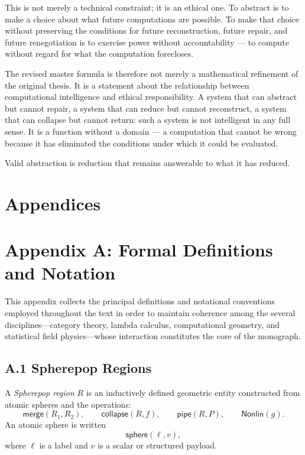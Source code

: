 \documentclass[12pt,letterpaper]{article}
\theoremstyle{remark}
\begin{document}
This is not merely a technical constraint; it is an ethical one.
To abstract is to make a choice about what future computations are
possible. To make that choice without preserving the conditions for
future reconstruction, future repair, and future renegotiation is
to exercise power without accountability — to compute without
regard for what the computation forecloses.

The revised master formula is therefore not merely a mathematical
refinement of the original thesis. It is a statement about the
relationship between computational intelligence and ethical
responsibility. A system that can abstract but cannot repair, a
system that can reduce but cannot reconstruct, a system that can
collapse but cannot return: such a system is not intelligent in any
full sense. It is a function without a domain — a computation that
cannot be wrong because it has eliminated the conditions under
which it could be evaluated.

Valid abstraction is reduction that remains answerable to what it
has reduced.

\newpage
\appendix
\section*{Appendices}


\section{Appendix A: Formal Definitions and Notation}

This appendix collects the principal definitions and notational conventions
employed throughout the text in order to maintain coherence among the several
disciplines---category theory, lambda calculus, computational geometry, and
statistical field physics---whose interaction constitutes the core of the
monograph.

\subsection*{A.1 Spherepop Regions}
A \emph{Spherepop region} $R$ is an inductively defined geometric entity constructed
from atomic spheres and the operations:
\[
\mathsf{merge}(R_1,R_2), 
\qquad
\mathsf{collapse}(R,f),
\qquad
\mathsf{pipe}(R,P),
\qquad
\mathsf{Nonlin}(g).
\]
An atomic sphere is written
\[
\mathsf{sphere}(\ell, v),
\]
where $\ell$ is a label and $v$ is a scalar or structured payload.
\end{document}
